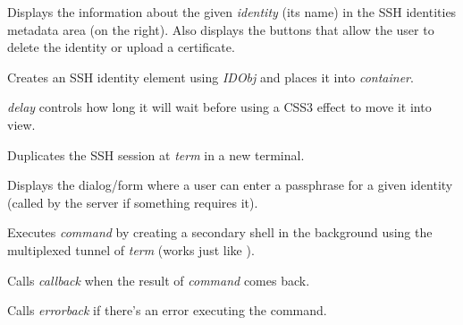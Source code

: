 \documentclass[letterpaper,10pt,openany]{sphinxmanual}
\begin{document}
\begin{fulllineitems}
\label{Applications/terminal/plugin_ssh:GateOne.SSH.displayMetadata}
Displays the information about the given \emph{identity} (its name) in the SSH identities metadata area (on the right).  Also displays the buttons that allow the user to delete the identity or upload a certificate.

\end{fulllineitems}


\begin{fulllineitems}
Creates an SSH identity element using \emph{IDObj} and places it into \emph{container}.

\emph{delay} controls how long it will wait before using a CSS3 effect to move it into view.

\end{fulllineitems}


\begin{fulllineitems}
\label{Applications/terminal/plugin_ssh:GateOne.SSH.duplicateSession}
Duplicates the SSH session at \emph{term} in a new terminal.

\end{fulllineitems}


\begin{fulllineitems}
\label{Applications/terminal/plugin_ssh:GateOne.SSH.enterPassphraseAction}
Displays the dialog/form where a user can enter a passphrase for a given identity (called by the server if something requires it).

\end{fulllineitems}


\begin{fulllineitems}
\label{Applications/terminal/plugin_ssh:GateOne.SSH.execRemoteCmd}
Executes \emph{command} by creating a secondary shell in the background using the multiplexed tunnel of \emph{term} (works just like {\hyperref[Applications/terminal/plugin_ssh:GateOne.SSH.duplicateSession]{}}).

Calls \emph{callback} when the result of \emph{command} comes back.

Calls \emph{errorback} if there's an error executing the command.

\end{fulllineitems}
\end{document}
